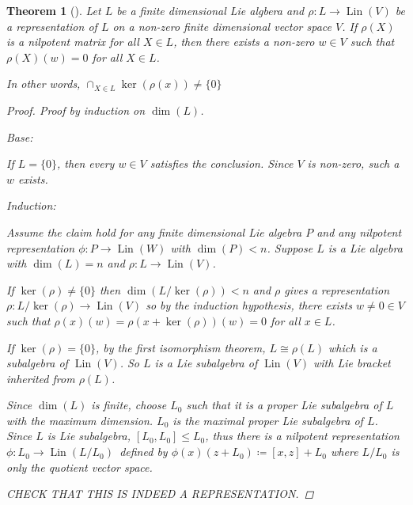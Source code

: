 \documentclass[letterpaper, 10pt]{article}
\theoremstyle{theostyle}
\newtheorem{theorem}{Theorem}[section]
\newenvironment{thmstyle}[1][]{%
    \begin{theorem}[#1]\leavevmode\vspace{-\baselineskip}\myquote%
    }{\endmyquote\end{theorem}}
\begin{document}
\begin{thmstyle}
    Let \(L\) be a finite dimensional Lie algbera and \(\rho: L \rightarrow \operatorname{Lin}{(V)}\) be a representation of \(L\) on a non-zero finite dimensional vector space \(V\).
    If \(\rho(X)\) is a nilpotent matrix for all \(X \in L\), then there exists a non-zero \(w \in V\) such that \(\rho(X)(w) = 0\) for all \(X \in L\).

    In other words, \(\displaystyle \cap_{X \in L} \ker{(\rho(x))} \neq \{0\}\)

    \begin{proof}
        Proof by induction on \(\dim{(L)}\).

        Base:

        If \(L = \{0\}\), then every \(w \in V\) satisfies the conclusion.
        Since \(V\) is non-zero, such a \(w\) exists.

        Induction:

        Assume the claim hold for any finite dimensional Lie algebra \(P\) and any nilpotent representation \(\phi: P \rightarrow \operatorname{Lin}{(W)}\) with \(\dim{(P)} < n\).
        Suppose \(L\) is a Lie algebra with \(\dim{(L)} = n\) and \(\rho: L \rightarrow \operatorname{Lin}{(V)}\).
        
        If \(\ker{(\rho)} \neq \{0\}\) then \(\dim{\left(L/\ker{(\rho)}\right)} < n\) and \(\rho\) gives a representation \(\rho : L/\ker{(\rho)} \rightarrow \operatorname{Lin}{(V)}\)
        so by the induction hypothesis, there exists \(w \neq 0 \in V\) such that \(\rho(x)(w) = \rho(x + \ker{(\rho)})(w) = 0\) for all \(x \in L\).

        If \(\ker{(\rho)} = \{0\}\), by the first isomorphism theorem, \(L \cong \rho(L)\) which is a subalgebra of \(\operatorname{Lin}{(V)}\).
        So \(L\) is a Lie subalgebra of \(\operatorname{Lin}{(V)}\) with Lie bracket inherited from \(\rho(L)\).

        Since \(\dim{(L)}\) is finite, choose \(L_0\) such that it is a proper Lie subalgebra of \(L\) with the maximum dimension.
        \(L_0\) is the maximal proper Lie subalgebra of \(L\).
        Since \(L\) is Lie subalgebra, \([L_0, L_0] \leq L_0\), thus there is a nilpotent representation \(\phi:L_0 \rightarrow \operatorname{Lin}{(L/L_0)}\)\
        defined by \(\phi(x)(z + L_0) \coloneqq [x, z] + L_0\) where \(L/L_0\) is only the quotient vector space.

        CHECK THAT THIS IS INDEED A REPRESENTATION.


\end{proof}
\end{thmstyle}
\end{document}
